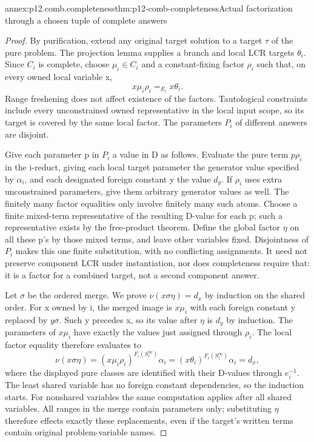 \begin{annexitem}{annex:p12.comb.completeness}{thm:p12-comb-completeness}{Actual factorization through a chosen tuple of complete answers}
\begin{proof}
By purification, extend any original target solution to a target
\(\tau\) of the pure problem. The projection lemma supplies a branch
and local LCR targets \(\theta_i\). Since \(C_i\) is complete,
choose \(\mu_i\in C_i\) and a constant-fixing factor \(\rho_i\)
such that, on every owned local variable x,
\[
                  x\mu_i\rho_i=_{E_i}x\theta_i.
\]
Range freshening does not affect existence of the factors. Tautological
constraints include every unconstrained owned representative in the
local input scope, so its target is covered by the same local factor.
The
parameters \(P_i\) of different answers are disjoint.

Give each parameter p in \(P_i\) a value in D as follows. Evaluate
the pure term \(p\rho_i\) in the i-reduct, giving each local target
parameter the generator value specified by \(\alpha_i\), and each
designated foreign constant y the value \(d_y\).
If \(\rho_i\) uses extra unconstrained parameters, give them arbitrary
generator values as well. The finitely many factor equalities only
involve finitely many such atoms. Choose a finite mixed-term
representative of the resulting D-value for each p; such a representative
exists by the free-product theorem. Define the global factor \(\eta\)
on all these p's by those mixed terms, and leave other variables fixed.
Disjointness of \(P_i\) makes this one finite substitution, with no
conflicting assignments. It need not preserve component LCR under
instantiation, nor does completeness require that: it is a factor
for a combined target, not a second component answer.

Let \(\sigma\) be the ordered merge. We prove
\(\nu(x\sigma\eta)=d_x\) by induction on the shared order.
For x owned by i, the merged image is \(x\mu_i\) with each
foreign constant y replaced by \(y\sigma\). Such y precedes x,
so its value after \(\eta\) is \(d_y\) by induction. The parameters
of \(x\mu_i\) have exactly the values just assigned through
\(\rho_i\). The local factor equality therefore evaluates to
\[
 \nu(x\sigma\eta)
 = (x\mu_i\rho_i)^{F_i(S_i^\infty)}\alpha_i
 = (x\theta_i)^{F_i(S_i^\infty)}\alpha_i
 = d_x,
\]
where the displayed pure classes are identified with their D-values
through \(e_i^{-1}\). The least shared variable has no foreign
constant dependencies, so the induction starts. For nonshared
variables the same computation applies after all shared variables.
All ranges in the merge contain parameters only; substituting
\(\eta\) therefore effects exactly these replacements, even if
the target's written terms contain original problem-variable names.


\end{proof}
\end{annexitem}
